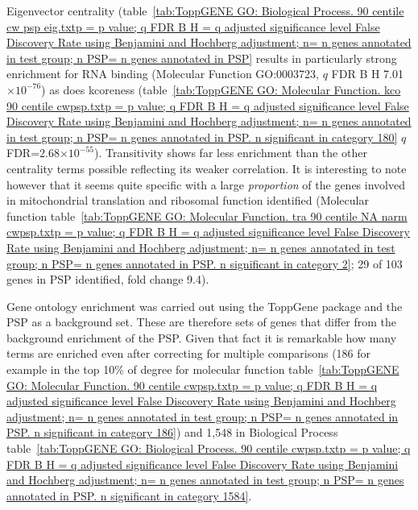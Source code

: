  Eigenvector centrality (table~\ref{tab:ToppGENE GO: Biological Process. 90 centile cw psp eig.txtp = p value; q FDR B H = q adjusted significance level False Discovery Rate using Benjamini and Hochberg adjustment; n= n genes annotated in test group; n PSP= n genes annotated in PSP} results in particularly strong enrichment for RNA binding (Molecular Function GO:0003723, $q$ FDR B H 7.01$\times10^{-76}$) as does kcoreness (table~\ref{tab:ToppGENE GO: Molecular Function. kco 90 centile cwpsp.txtp = p value; q FDR B H = q adjusted significance level False Discovery Rate using Benjamini and Hochberg adjustment; n= n genes annotated in test group; n PSP= n genes annotated in PSP. n significant in category 180} $q$ FDR=2.68$\times10^{-55}$). Transitivity shows far less enrichment than the other centrality terms possible reflecting its weaker correlation. It is interesting to note however that it seems quite specific with a large \textit{proportion} of the genes involved in mitochondrial translation and ribosomal function identified (Molecular function table~\ref{tab:ToppGENE GO: Molecular Function. tra 90 centile NA narm cwpsp.txtp = p value; q FDR B H = q adjusted significance level False Discovery Rate using Benjamini and Hochberg adjustment; n= n genes annotated in test group; n PSP= n genes annotated in PSP. n significant in category 2}; 29 of 103 genes in PSP identified, fold change 9.4). 


Gene ontology enrichment was carried out using the ToppGene package and the PSP as a background set. These are therefore sets of genes that differ from the background enrichment of the PSP. Given that fact it is remarkable how many terms are enriched even after correcting for multiple comparisons (186 for example in the top 10\% of degree for molecular function table~\ref{tab:ToppGENE GO: Molecular Function. 90 centile cwpsp.txtp = p value; q FDR B H = q adjusted significance level False Discovery Rate using Benjamini and Hochberg adjustment; n= n genes annotated in test group; n PSP= n genes annotated in PSP. n significant in category 186}) and 1,548 in Biological Process table~\ref{tab:ToppGENE GO: Biological Process. 90 centile cwpsp.txtp = p value; q FDR B H = q adjusted significance level False Discovery Rate using Benjamini and Hochberg adjustment; n= n genes annotated in test group; n PSP= n genes annotated in PSP. n significant in category 1584}.

